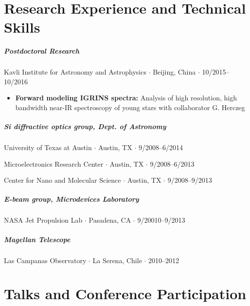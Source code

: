 \documentclass[10pt,letterpaper]{article}
\begin{document}
\section*{Research Experience and Technical Skills}

\subparagraph{Postdoctoral Research}
Kavli Institute for Astronomy and Astrophysics $\cdot$ Beijing, China $\cdot$ 10/2015--10/2016
\begin{itemize}
    \item  \textbf{Forward modeling IGRINS spectra:} Analysis of high resolution, high bandwidth near-IR spectroscopy of young stars with collaborator G. Herczeg
\end{itemize}

\subparagraph{Si diffractive optics group, Dept. of Astronomy}
University of Texas at Austin $\cdot$ Austin, TX $\cdot$ 9/2008--6/2014
\begin{flushright}
Microelectronics Research Center $\cdot$ Austin, TX $\cdot$ 9/2008--6/2013 

Center for Nano and Molecular Science $\cdot$ Austin, TX $\cdot$ 9/2008--9/2013
\end{flushright}


\subparagraph{E-beam group, Microdevices Laboratory}
NASA Jet Propulsion Lab $\cdot$ Pasadena, CA $\cdot$ 9/20010--9/2013

\subparagraph{Magellan Telescope}
Las Campanas Observatory $\cdot$ La Serena, Chile $\cdot$ 2010--2012





\section*{Talks and Conference Participation}
\end{document}
